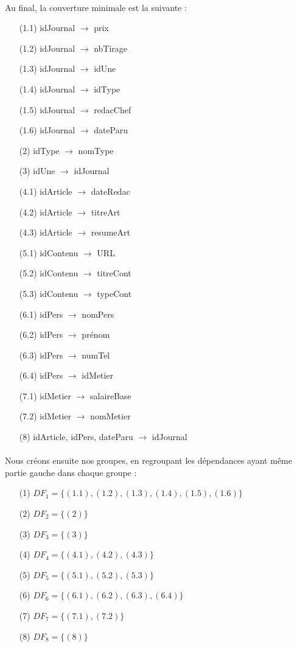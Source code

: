 \paragraph{}{Au final, la couverture minimale est la suivante :
\begin{enumerate}
    \item[(1.1)] idJournal $\rightarrow$ prix
    \item[(1.2)] idJournal $\rightarrow$ nbTirage
    \item[(1.3)] idJournal $\rightarrow$ idUne
    \item[(1.4)] idJournal $\rightarrow$ idType
    \item[(1.5)] idJournal $\rightarrow$ redacChef
    \item[(1.6)] idJournal $\rightarrow$ dateParu
    \item[(2)] idType $\rightarrow$ nomType
    \item[(3)] idUne $\rightarrow$ idJournal
    \item[(4.1)] idArticle $\rightarrow$ dateRedac
    \item[(4.2)] idArticle $\rightarrow$ titreArt
    \item[(4.3)] idArticle $\rightarrow$ resumeArt
    \item[(5.1)] idContenu $\rightarrow$ URL
    \item[(5.2)] idContenu $\rightarrow$ titreCont
    \item[(5.3)] idContenu $\rightarrow$ typeCont
    \item[(6.1)] idPers $\rightarrow$ nomPers
    \item[(6.2)] idPers $\rightarrow$ prénom
    \item[(6.3)] idPers $\rightarrow$ numTel
    \item[(6.4)] idPers $\rightarrow$ idMetier
    \item[(7.1)] idMetier $\rightarrow$ salaireBase
    \item[(7.2)] idMetier $\rightarrow$ nomMetier
    \item[(8)] idArticle, idPers, dateParu $\rightarrow$ idJournal
\end{enumerate}}

\paragraph{}{Nous créons ensuite nos groupes, en regroupant les dépendances ayant même partie gauche dans chaque groupe :
\begin{enumerate}
    \item[(1)] $DF_1 = \{ (1.1), (1.2), (1.3), (1.4), (1.5), (1.6) \}$
    \item[(2)] $DF_2 = \{ (2) \}$
    \item[(3)] $DF_3 = \{ (3) \}$
    \item[(4)] $DF_4 = \{ (4.1), (4.2), (4.3) \}$
    \item[(5)] $DF_5 = \{ (5.1), (5.2), (5.3) \}$
    \item[(6)] $DF_6 = \{ (6.1), (6.2), (6.3), (6.4) \}$
    \item[(7)] $DF_7 = \{ (7.1), (7.2) \}$
    \item[(8)] $DF_8 = \{ (8) \}$
\end{enumerate}}

